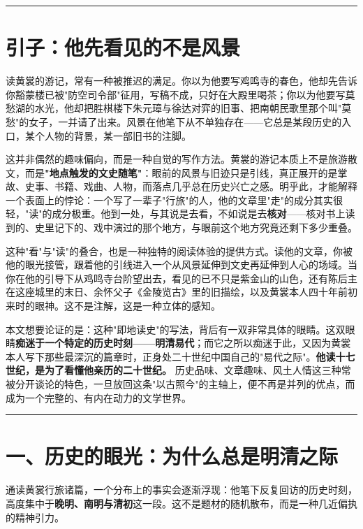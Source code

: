 \documentclass[UTF8,fontset=none,zihao=-4,a4paper]{ctexart}
\begin{document}
\medskip\hrule\medskip

\section{引子：他先看见的不是风景}


读黄裳的游记，常有一种被推迟的满足。你以为他要写鸡鸣寺的春色，他却先告诉你豁蒙楼已被"防空司令部"征用，写稿不成，只好在大殿里喝茶；你以为他要写莫愁湖的水光，他却把胜棋楼下朱元璋与徐达对弈的旧事、把南朝民歌里那个叫"莫愁"的女子，一并请了出来。风景在他笔下从不单独存在——它总是某段历史的入口，某个人物的背景，某一部旧书的注脚。


这并非偶然的趣味偏向，而是一种自觉的写作方法。黄裳的游记本质上不是旅游散文，而是\textbf{"地点触发的文史随笔"}：眼前的风景与旧迹只是引线，真正展开的是掌故、史事、书籍、戏曲、人物，而落点几乎总在历史兴亡之感。明乎此，才能解释一个表面上的悖论：一个写了一辈子"行旅"的人，他的文章里"走"的成分其实很轻，"读"的成分极重。他到一处，与其说是去看，不如说是去\textbf{核对}——核对书上读到的、史里记下的、戏中演过的那个地方，与眼前这个地方究竟还剩下多少重叠。


这种"看"与"读"的叠合，也是一种独特的阅读体验的提供方式。读他的文章，你被他的眼光接管，跟着他的引线进入一个从风景延伸到文史再延伸到人心的场域。当你在他的引导下从鸡鸣寺台阶望出去，看见的已不只是紫金山的山色，还有陈后主在这座城里的末日、余怀父子《金陵览古》里的旧描绘，以及黄裳本人四十年前初来时的眼神。这不是注解，这是一种立体的感知。


本文想要论证的是：这种"即地读史"的写法，背后有一双非常具体的眼睛。这双眼睛\textbf{痴迷于一个特定的历史时刻——明清易代}；而它之所以痴迷于此，又因为黄裳本人写下那些最深沉的篇章时，正身处二十世纪中国自己的"易代之际"。\textbf{他读十七世纪，是为了看懂他亲历的二十世纪。} 历史品味、文章趣味、风土人情这三种常被分开谈论的特色，一旦放回这条"以古照今"的主轴上，便不再是并列的优点，而成为一个完整的、有内在动力的文学世界。


\medskip\hrule\medskip

\section{一、历史的眼光：为什么总是明清之际}


通读黄裳行旅诸篇，一个分布上的事实会逐渐浮现：他笔下反复回访的历史时刻，高度集中于\textbf{晚明、南明与清初}这一段。这不是题材的随机散布，而是一种几近偏执的精神引力。
\end{document}
